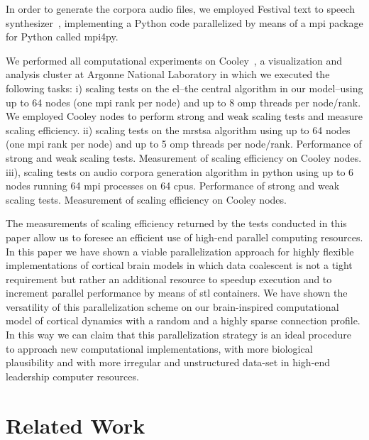 \documentclass[10pt,journal,compsoc]{IEEEtran}
\begin{document}
In order to generate the corpora audio files, we employed Festival text to speech synthesizer~\cite{festival2014}, implementing a Python code parallelized by means of a \gls{mpi} package for Python called mpi4py.

We performed all computational experiments on Cooley~\cite{noauthor_cooley_nodate}, a visualization and analysis cluster at Argonne National Laboratory in which we executed the following tasks: i) scaling tests on the \gls{el}--the central algorithm in our model--using up to 64 nodes (one \gls{mpi} rank per node) and up to 8 \gls{omp} threads per node/rank. We employed Cooley nodes to perform strong and weak scaling tests and measure scaling efficiency. ii) scaling tests on the \gls{mrstsa} algorithm using up to 64 nodes (one \gls{mpi} rank per node) and up to 5 \gls{omp} threads per node/rank. Performance of strong and weak scaling tests. Measurement of scaling efficiency on Cooley nodes. iii),  scaling tests on audio corpora generation algorithm in python using up to 6 nodes running 64 \gls{mpi} processes on 64 \glspl{cpu}. Performance of strong and weak scaling tests. Measurement of scaling efficiency on Cooley nodes.

The measurements of scaling efficiency returned by the tests conducted in this paper allow us to foresee an efficient use of high-end parallel computing resources. In this paper we have shown a viable parallelization approach for highly flexible implementations of cortical brain models in which data coalescent is not a tight requirement but rather an additional resource to speedup execution and to increment parallel performance by means of \gls{stl} containers. We have shown the versatility of this parallelization scheme on our brain-inspired computational model of cortical dynamics with a random and a highly sparse connection profile. In this way we can claim that this parallelization strategy is an ideal procedure to approach new computational implementations, with more biological plausibility and with more irregular and unstructured data-set in high-end leadership computer resources.


















\section{Related Work}
\end{document}
